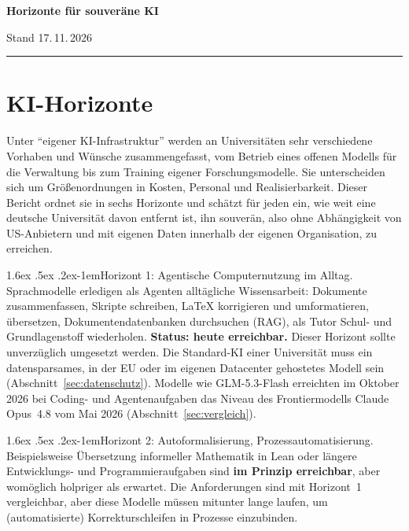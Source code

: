 \documentclass[a4paper,11pt]{article}
\makeatletter
\renewcommand\paragraph{\@startsection{paragraph}{4}{\z@}%
  {1.6ex \@plus .5ex \@minus .2ex}{-1em}{\normalfont\normalsize\bfseries}}
\makeatother
\begin{document}
{\LARGE\bfseries Horizonte für souveräne KI\par}
\smallskip
{\small Stand 17.\,11.\,2026\par}
\medskip
\hrule
\bigskip

\section{KI-Horizonte}
\label{sec:horizonte}

Unter \enquote{eigener KI-Infrastruktur} werden an Universitäten sehr
verschiedene Vorhaben und Wünsche zusammengefasst, vom Betrieb eines
offenen Modells für die Verwaltung bis zum Training eigener
Forschungsmodelle.  Sie unterscheiden sich um Größenordnungen in
Kosten, Personal und Realisierbarkeit. Dieser Bericht ordnet sie in
sechs Horizonte und schätzt für jeden ein, wie weit eine deutsche
Universität davon entfernt ist, ihn souverän, also ohne Abhängigkeit
von US-Anbietern und mit eigenen Daten innerhalb der eigenen Organisation, zu erreichen.

\paragraph{Horizont 1: Agentische Computernutzung im Alltag.}
Sprachmodelle erledigen als Agenten alltägliche Wissensarbeit:
Dokumente zusammenfassen, Skripte schreiben, \LaTeX{} korrigieren und
umformatieren, übersetzen, Dokumentendatenbanken durchsuchen (RAG),
als Tutor Schul- und Grundlagenstoff wiederholen. \textbf{Status:
  heute erreichbar.}
 Dieser Horizont sollte unverzüglich umgesetzt
werden.  Die Standard-KI einer Universität muss ein datensparsames, in
der EU oder im eigenen Datacenter gehostetes Modell sein
(Abschnitt~\ref{sec:datenschutz}).  Modelle wie GLM-5.3-Flash
erreichten im Oktober 2026 bei Coding- und Agentenaufgaben das Niveau
des Frontiermodells Claude Opus~4.8 vom Mai 2026
(Abschnitt~\ref{sec:vergleich}).

\paragraph{Horizont 2: Autoformalisierung, Prozessautomatisierung.}
Beispielsweise Übersetzung informeller Mathematik in Lean oder längere
Entwicklungs- und Programmieraufgaben sind \textbf{im Prinzip
  erreichbar}, aber womöglich holpriger als erwartet.  Die
Anforderungen sind mit Horizont~1 vergleichbar, aber diese Modelle
müssen mitunter lange laufen, um (automatisierte) Korrekturschleifen in
Prozesse einzubinden.
\end{document}
